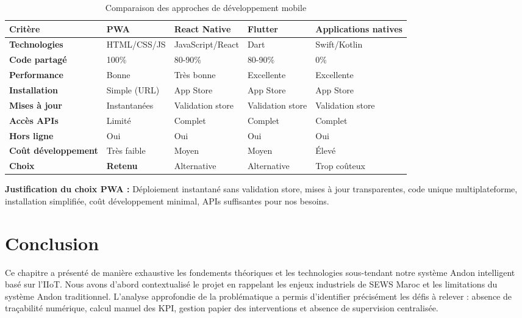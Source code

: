 \begin{table}[htbp]
\centering
\small
\caption{Comparaison des approches de développement mobile}
\label{tab:mobile_comparison}
\begin{tabular}{|p{2.5cm}|p{2.5cm}|p{2.5cm}|p{2.5cm}|p{2.5cm}|}
\hline
\rowcolor{sewesblu!20}
\textbf{Critère} & \textbf{PWA} & \textbf{React Native} & \textbf{Flutter} & \textbf{Applications natives} \\
\hline
\textbf{Technologies} & HTML/CSS/JS & JavaScript/React & Dart & Swift/Kotlin \\
\hline
\textbf{Code partagé} & 100\% & 80-90\% & 80-90\% & 0\% \\
\hline
\textbf{Performance} & Bonne & Très bonne & Excellente & Excellente \\
\hline
\textbf{Installation} & Simple (URL) & App Store & App Store & App Store \\
\hline
\textbf{Mises à jour} & Instantanées & Validation store & Validation store & Validation store \\
\hline
\textbf{Accès APIs} & Limité & Complet & Complet & Complet \\
\hline
\textbf{Hors ligne} & Oui & Oui & Oui & Oui \\
\hline
\textbf{Coût développement} & Très faible & Moyen & Moyen & Élevé \\
\hline
\rowcolor{green!10}
\textbf{Choix} & \textbf{Retenu} & Alternative & Alternative & Trop coûteux \\
\hline
\end{tabular}
\end{table}

\textbf{Justification du choix PWA :} Déploiement instantané sans validation store, mises à jour transparentes, code unique multiplateforme, installation simplifiée, coût développement minimal, APIs suffisantes pour nos besoins.


\section{Conclusion}

Ce chapitre a présenté de manière exhaustive les fondements théoriques et les technologies sous-tendant notre système Andon intelligent basé sur l'IIoT. Nous avons d'abord contextualisé le projet en rappelant les enjeux industriels de SEWS Maroc et les limitations du système Andon traditionnel. L'analyse approfondie de la problématique a permis d'identifier précisément les défis à relever : absence de traçabilité numérique, calcul manuel des KPI, gestion papier des interventions et absence de supervision centralisée.

